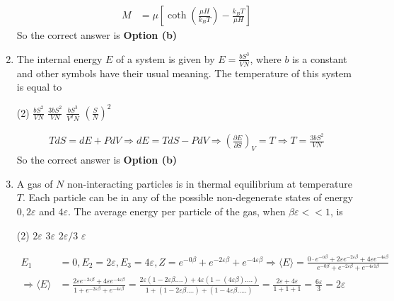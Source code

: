 \begin{enumerate}
\begin{answer}
\begin{align*}
	M&=\mu\left[\operatorname{coth}\left(\frac{\mu H}{k_{B} T}\right)-\frac{k_{B} T}{\mu H}\right]
	\end{align*}
		So the correct answer is \textbf{Option (b)}
\end{answer}
\item 	The internal energy $E$ of a system is given by $E=\frac{b S^{3}}{V N}$, where $b$ is a constant and other symbols have their usual meaning. The temperature of this system is equal to
	 \begin{tasks}(2)
		\task[\textbf{a.}]$\frac{b S^{2}}{V N}$
		\task[\textbf{b.}]$\frac{3 b S^{2}}{V N}$
		\task[\textbf{c.}]$\frac{b S^{3}}{V^{2} N}$
		\task[\textbf{d.}] $\left(\frac{S}{N}\right)^{2}$
	\end{tasks}
\begin{answer}
	\begin{align*}
	T d S=d E+P d V \Rightarrow d E=T d S-P d V \Rightarrow\left(\frac{\partial E}{\partial S}\right)_{V}=T \Rightarrow T=\frac{3 b S^{2}}{V N}
	\end{align*}
	So the correct answer is \textbf{Option (b)}
\end{answer}
\item A gas of $N$ non-interacting particles is in thermal equilibrium at temperature $T$. Each particle can be in any of the possible non-degenerate states of energy $0,2 \varepsilon$ and $4 \varepsilon$. The average energy per particle of the gas, when $\beta \varepsilon<<1$, is
 \begin{tasks}(2)
	\task[\textbf{a.}]$2 \varepsilon$
	\task[\textbf{b.}] $3 \varepsilon$
	\task[\textbf{c.}]$2 \varepsilon / 3$
	\task[\textbf{d.}]  $\varepsilon$
\end{tasks}	
\begin{answer}
	\begin{align*}
	E_{1}&=0, E_{2}=2 \varepsilon, E_{3}=4 \varepsilon, Z=e^{-0 \beta}+e^{-2 \varepsilon \beta}+e^{-4 \varepsilon \beta} \Rightarrow\langle E\rangle=\frac{0 \cdot e^{-o \beta}+2 \varepsilon e^{-2 \varepsilon \beta}+4 \varepsilon e^{-4 \varepsilon \beta}}{e^{-0 \beta}+e^{-2 \varepsilon \beta}+e^{-4 \varepsilon 1 \beta}} \\
	\Rightarrow\langle E\rangle&=\frac{2 \varepsilon e^{-2 \varepsilon \beta}+4 \varepsilon e^{-4 \varepsilon \beta}}{1+e^{-2 \varepsilon \beta}+e^{-4 \varepsilon \beta}}=\frac{2 \varepsilon(1-2 \varepsilon \beta \ldots .)+4 \varepsilon(1-(4 \varepsilon \beta) \ldots .)}{1+(1-2 \varepsilon \beta \ldots .)+(1-4 \varepsilon \beta \ldots . .)}=\frac{2 \varepsilon+4 \varepsilon}{1+1+1}=\frac{6 \varepsilon}{3}=2 \varepsilon\\

\end{align*}
\end{answer}
\end{enumerate}
